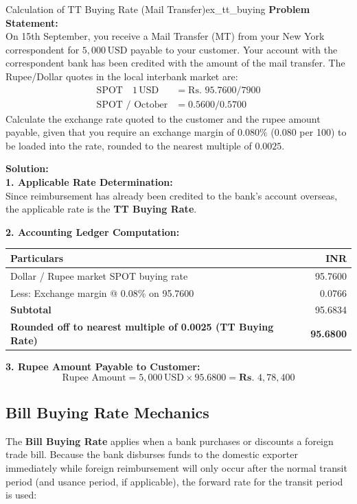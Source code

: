 \begin{example}{Calculation of TT Buying Rate (Mail Transfer)}{ex_tt_buying}
\textbf{Problem Statement:}\\
On 15th September, you receive a Mail Transfer (MT) from your New York correspondent for $5,000\,\text{USD}$ payable to your customer. Your account with the correspondent bank has been credited with the amount of the mail transfer. The Rupee/Dollar quotes in the local interbank market are:
\begin{align*}
    \text{SPOT} \quad 1\,\text{USD} &= \text{Rs. } 95.7600 / 7900 \\
    \text{SPOT / October} &= 0.5600 / 0.5700
\end{align*}
Calculate the exchange rate quoted to the customer and the rupee amount payable, given that you require an exchange margin of $0.080\%$ ($0.080$ per 100) to be loaded into the rate, rounded to the nearest multiple of $0.0025$.

\tcblower
\textbf{Solution:}\\
\noindent\textbf{1. Applicable Rate Determination:}\\
Since reimbursement has already been credited to the bank's account overseas, the applicable rate is the \textbf{TT Buying Rate}.

\noindent\textbf{2. Accounting Ledger Computation:}
\begin{center}
\small
\begin{tabularx}{\linewidth}{Xr}
\toprule
\textbf{Particulars} & \textbf{INR} \\
\midrule
Dollar / Rupee market SPOT buying rate & 95.7600 \\
Less: Exchange margin @ 0.08\% on 95.7600 & 0.0766 \\
\midrule
\textbf{Subtotal} & 95.6834 \\
\textbf{Rounded off to nearest multiple of 0.0025 (TT Buying Rate)} & \textbf{95.6800} \\
\bottomrule
\end{tabularx}
\end{center}

\noindent\textbf{3. Rupee Amount Payable to Customer:}
\begin{equation*}
    \text{Rupee Amount} = 5,000\,\text{USD} \times 95.6800 = \textbf{Rs. } 4,78,400
\end{equation*}
\end{example}

\subsection{Bill Buying Rate Mechanics}
The \textbf{Bill Buying Rate} applies when a bank purchases or discounts a foreign trade bill. Because the bank disburses funds to the domestic exporter immediately while foreign reimbursement will only occur after the normal transit period (and usance period, if applicable), the forward rate for the transit period is used:

